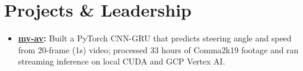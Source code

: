 \documentclass[11pt, letterpaper]{article}
\begin{document}
\section{Projects \& Leadership}
\begin{itemize}
  \item \textbf{\href{https://github.com/lordphone/my-av}{my-av}:} Built a PyTorch CNN-GRU that predicts steering angle and speed from 20-frame (1s) video; processed 33 hours of Comma2k19 footage and ran streaming inference on local CUDA and GCP Vertex AI.
\end{itemize}
\end{document}
